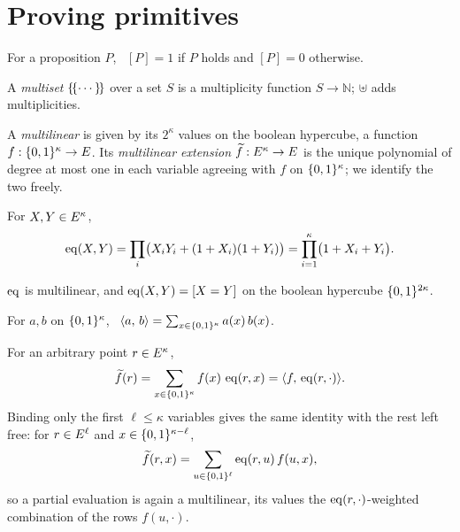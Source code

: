 \section{Proving primitives}\label{sec:prelim}

\begin{definition}\label{def:iverson}
For a proposition $P$, \ $[P]=1$ if $P$ holds and $[P]=0$ otherwise.
\end{definition}

\begin{definition}[Multiset]\label{def:multiset}
A \emph{multiset} $\{\!\{\cdots\}\!\}$ over a set $S$ is a multiplicity function $S\to\mathbb{N}$; $\uplus$ adds multiplicities.
\end{definition}

\begin{definition}\label{def:mle}
A \emph{multilinear} is given by its $2^{\kappa}$ values on the boolean hypercube, a function $f:\{0,1\}^{\kappa}\to E$. Its \emph{multilinear extension} $\widetilde{f}:E^{\kappa}\to E$ is the unique polynomial of degree at most one in each variable agreeing with $f$ on $\{0,1\}^{\kappa}$; we identify the two freely.
\end{definition}


\begin{definition}\label{def:eq}
For $X,Y\in E^{\kappa}$,
\[
  \operatorname{eq}(X,Y)= \prod_i\bigl(X_iY_i+(1+X_i)(1+Y_i)\bigr) = \prod_{i=1}^{\kappa}\bigl(1+X_i+Y_i\bigr).
\]
\end{definition}

$\operatorname{eq}$ is multilinear, and $\operatorname{eq}(X,Y)=[X=Y]$ on the boolean hypercube $\{0,1\}^{2\kappa}$.

\begin{definition}\label{def:inner}
For $a,b$ on $\{0,1\}^{\kappa}$, \ $\langle a,\, b \rangle=\sum_{x\in\{0,1\}^{\kappa}}a(x)\,b(x)$.
\end{definition}

\begin{fact}\label{fact:eq}
For an arbitrary point $r\in E^{\kappa}$,
\[
  \widetilde{f}(r)=\sum_{x\in\{0,1\}^{\kappa}}f(x)\,\operatorname{eq}(r,x)=\langle f,\, \operatorname{eq}(r,\cdot) \rangle.
\]
Binding only the first $\ell\le\kappa$ variables gives the same identity with the rest left free: for $r\in E^{\ell}$ and $x\in\{0,1\}^{\kappa-\ell}$,
\[
  \widetilde{f}(r,x)=\sum_{u\in\{0,1\}^{\ell}}\operatorname{eq}(r,u)\,f(u,x),
\]
so a partial evaluation is again a multilinear, its values the $\operatorname{eq}(r,\cdot)$-weighted combination of the rows $f(u,\cdot)$.
\end{fact}


